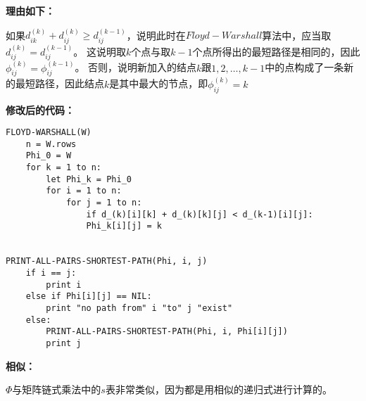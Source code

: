 \documentclass[UTF8]{ctexart}
\begin{document}
    \textbf{理由如下：}

    如果$d^{(k)}_{ik}+d^{(k)}_{ij}\ge d^{(k-1)}_{ij}$，说明此时在$Floyd-Warshall$算法中，应当取$d^{(k)}_{ij}=d^{(k-1)}_{ij}$。
    这说明取$k$个点与取$k-1$个点所得出的最短路径是相同的，因此$\phi^{(k)}_{ij}=\phi^{(k-1)}_{ij}$。
    否则，说明新加入的结点$k$跟${1,2,\ldots,k-1}$中的点构成了一条新的最短路径，因此结点$k$是其中最大的节点，即$\phi^{(k)}_{ij}=k$

    \textbf{修改后的代码：}
    \begin{lstlisting}
FLOYD-WARSHALL(W)
    n = W.rows
    Phi_0 = W
    for k = 1 to n:
        let Phi_k = Phi_0
        for i = 1 to n:
            for j = 1 to n:
                if d_(k)[i][k] + d_(k)[k][j] < d_(k-1)[i][j]:
                Phi_k[i][j] = k


PRINT-ALL-PAIRS-SHORTEST-PATH(Phi, i, j)
    if i == j:
        print i
    else if Phi[i][j] == NIL:
        print "no path from" i "to" j "exist"
    else:
        PRINT-ALL-PAIRS-SHORTEST-PATH(Phi, i, Phi[i][j])
        print j
    \end{lstlisting}

    \textbf{相似：}
    
    $\Phi$与矩阵链式乘法中的$s$表非常类似，因为都是用相似的递归式进行计算的。
\end{document}
